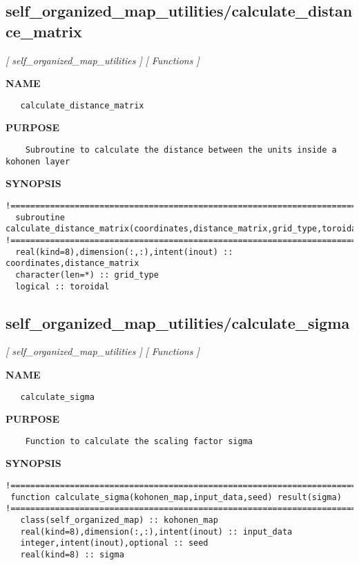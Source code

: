 \documentclass{article}
\begin{document}
\subsection{self\_organized\_map\_utilities/calculate\_distance\_matrix}
\textsl{[ self\_organized\_map\_utilities ]}
\textsl{[ Functions ]}

\label{ch:robo37}
\label{ch:self_organized_map_utilities_calculate_distance_matrix}
\textbf{NAME}
\begin{verbatim}
   calculate_distance_matrix
\end{verbatim}
\textbf{PURPOSE}
\begin{verbatim}
    Subroutine to calculate the distance between the units inside a kohonen layer 
\end{verbatim}
\textbf{SYNOPSIS}
\begin{verbatim}
!========================================================================================
  subroutine calculate_distance_matrix(coordinates,distance_matrix,grid_type,toroidal)
!========================================================================================
  real(kind=8),dimension(:,:),intent(inout) :: coordinates,distance_matrix
  character(len=*) :: grid_type
  logical :: toroidal
\end{verbatim}
\newpage
\subsection{self\_organized\_map\_utilities/calculate\_sigma}
\textsl{[ self\_organized\_map\_utilities ]}
\textsl{[ Functions ]}

\label{ch:robo38}
\label{ch:self_organized_map_utilities_calculate_sigma}
\textbf{NAME}
\begin{verbatim}
   calculate_sigma
\end{verbatim}
\textbf{PURPOSE}
\begin{verbatim}
    Function to calculate the scaling factor sigma
\end{verbatim}
\textbf{SYNOPSIS}
\begin{verbatim}
!========================================================================================
 function calculate_sigma(kohonen_map,input_data,seed) result(sigma)
!========================================================================================
   class(self_organized_map) :: kohonen_map
   real(kind=8),dimension(:,:),intent(inout) :: input_data
   integer,intent(inout),optional :: seed
   real(kind=8) :: sigma
\end{verbatim}
\newpage
\end{document}
